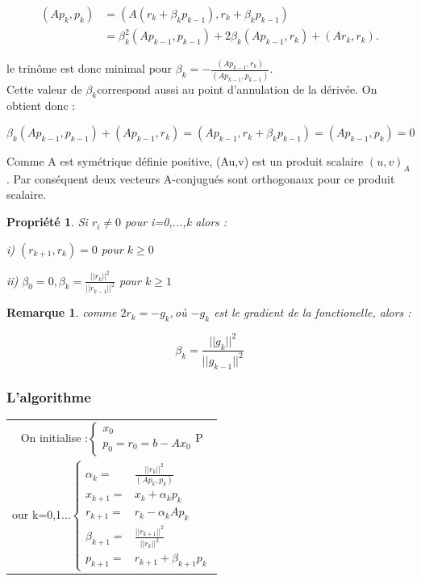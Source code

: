 \documentclass[12,french]{report}
\newtheorem{proposition}{Propriété}[theorem]
\newtheorem{remark}{Remarque}[theorem]
\begin{document}
\begin{align*}
	(Ap_{k},p_{k}) & =(A(r_{k}+\beta_{k}p_{k-1}),r_{k}+\beta_{k}p_{k-1})\\
	& =\beta_{k}^{2}(Ap_{k-1},p_{k-1})+2\beta_{k}(Ap_{k-1},r_{k})+(Ar_{k},r_{k}).
\end{align*}

le trinôme est donc minimal pour $\beta_{k}=-\frac{(Ap_{k-1},r_{k})}{(Ap_{k-1},p_{k-1})}$.\\

Cette valeur de $\beta_{k}$correspond aussi au point d'annulation
de la dérivée. On obtient donc :

$$\beta_{k}(Ap_{k-1},p_{k-1})+(Ap_{k-1},r_{k})=(Ap_{k-1},r_{k}+\beta_{k}p_{k-1})=(Ap_{k-1},p_{k})=0$$

Comme A est symétrique définie positive, (Au,v) est un produit scalaire
$(u,v)_{A}$. Par conséquent deux vecteurs A-conjugués sont orthogonaux
pour ce produit scalaire.

\begin{proposition}
Si $r_{i}\neq0$ pour i=0,...,k alors :
\item [{i)}] $(r_{k+1},r_{k})=0$ pour $k\geq0$
\item [{ii)}] $\beta_{0}=0,\beta_{k}=\frac{||r_{k}||^{2}}{||r_{k-1}||^{2}}$
pour $k\geq1$
\end{proposition}

\begin{remark}
comme $2r_{k}=-g_{k},$où $-g_{k}$ est le gradient de la fonctionelle,
alors :

\[
\beta_{k}=\frac{||g_{k}||^{2}}{||g_{k-1}||^{2}}
\]

\end{remark}

\subsubsection{L'algorithme}

\begin{center}
	\begin{tabular}{|c|}
		\hline 
		On initialise :$\begin{cases}
			x_{0}\\
			p_{0}=r_{0}=b-Ax_{0}
		\end{cases}$P\tabularnewline
		our k=0,1...$\begin{cases}
			\alpha_{k}= & \frac{||r_{k}||^{2}}{(Ap_{k},p_{k})}\\
			x_{k+1}= & x_{k}+\alpha_{k}p_{k}\\
			r_{k+1}= & r_{k}-\alpha_{k}Ap_{k}\\
			\beta_{k+1}= & \frac{||r_{k+1}||^{2}}{||r_{k}||^{2}}\\
			p_{k+1}= & r_{k+1}+\beta_{k+1}p_{k}
		\end{cases}$\tabularnewline
		\hline 
	\end{tabular}
\end{center}
\end{document}
